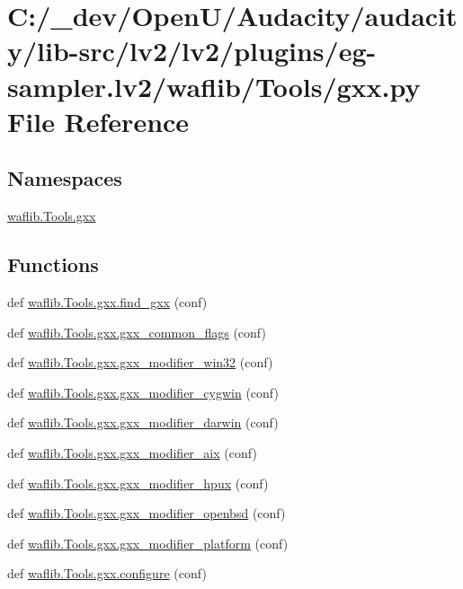 \hypertarget{lv2_2plugins_2eg-sampler_8lv2_2waflib_2_tools_2gxx_8py}{}\section{C\+:/\+\_\+dev/\+Open\+U/\+Audacity/audacity/lib-\/src/lv2/lv2/plugins/eg-\/sampler.lv2/waflib/\+Tools/gxx.py File Reference}
\label{lv2_2plugins_2eg-sampler_8lv2_2waflib_2_tools_2gxx_8py}
\subsection*{Namespaces}
\begin{DoxyCompactItemize}
\item 
 \hyperlink{namespacewaflib_1_1_tools_1_1gxx}{waflib.\+Tools.\+gxx}
\end{DoxyCompactItemize}
\subsection*{Functions}
\begin{DoxyCompactItemize}
\item 
def \hyperlink{namespacewaflib_1_1_tools_1_1gxx_a429b712dd222e6e975da527c68c08ba8}{waflib.\+Tools.\+gxx.\+find\+\_\+gxx} (conf)
\item 
def \hyperlink{namespacewaflib_1_1_tools_1_1gxx_a86410b2f6bcf01791c43e27ddebf3080}{waflib.\+Tools.\+gxx.\+gxx\+\_\+common\+\_\+flags} (conf)
\item 
def \hyperlink{namespacewaflib_1_1_tools_1_1gxx_a5161aa30bcb691ffeb6b39da4b9b2b62}{waflib.\+Tools.\+gxx.\+gxx\+\_\+modifier\+\_\+win32} (conf)
\item 
def \hyperlink{namespacewaflib_1_1_tools_1_1gxx_a70609bea69338d82affec21284c6c5dc}{waflib.\+Tools.\+gxx.\+gxx\+\_\+modifier\+\_\+cygwin} (conf)
\item 
def \hyperlink{namespacewaflib_1_1_tools_1_1gxx_afb73b72b4db84fa412549484f754901e}{waflib.\+Tools.\+gxx.\+gxx\+\_\+modifier\+\_\+darwin} (conf)
\item 
def \hyperlink{namespacewaflib_1_1_tools_1_1gxx_aae0a6b0cc6273670e94d02a1601481ca}{waflib.\+Tools.\+gxx.\+gxx\+\_\+modifier\+\_\+aix} (conf)
\item 
def \hyperlink{namespacewaflib_1_1_tools_1_1gxx_a5862cdb93d3572914361f8f6261e8a18}{waflib.\+Tools.\+gxx.\+gxx\+\_\+modifier\+\_\+hpux} (conf)
\item 
def \hyperlink{namespacewaflib_1_1_tools_1_1gxx_a6915c3fe47d85e1eca7787adfc24e570}{waflib.\+Tools.\+gxx.\+gxx\+\_\+modifier\+\_\+openbsd} (conf)
\item 
def \hyperlink{namespacewaflib_1_1_tools_1_1gxx_a8ac4de3cf5a92e00e8c75e1272521afa}{waflib.\+Tools.\+gxx.\+gxx\+\_\+modifier\+\_\+platform} (conf)
\item 
def \hyperlink{namespacewaflib_1_1_tools_1_1gxx_aaf1ce44a59356fa376d25557d760bf6a}{waflib.\+Tools.\+gxx.\+configure} (conf)
\end{DoxyCompactItemize}
